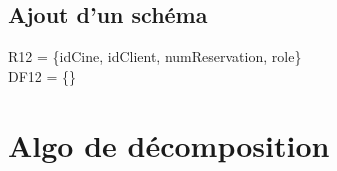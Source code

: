 \documentclass[a4paper,sffamily,12pt]{article}
\begin{document}
				\vspace{0.5cm}
								
			\subsection{Ajout d'un schéma} 	

				\vspace{0.5cm}
											
				R12 = \{idCine, idClient, numReservation, role\} \\ DF12 = \{\} \\

				\vspace{0.5cm}

			\section{Algo de décomposition}

				\vspace{0.5cm}
	
\end{document}
